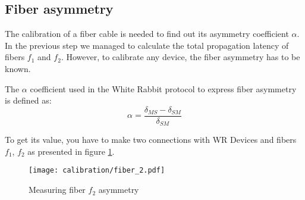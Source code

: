 \subsection{Fiber asymmetry}
\label{subsec:fiasym}

The calibration of a fiber cable is needed to find out its asymmetry coefficient
$\alpha$. In the previous step we managed to calculate the total propagation
latency of fibers $f_1$ and $f_2$. However, to calibrate any device, the fiber
asymmetry has to be known.

The $\alpha$ coefficient used in the White Rabbit protocol to express fiber 
asymmetry is defined as:
\begin{equation}
	\alpha = \frac{\delta_{MS} - \delta_{SM}}{\delta_{SM}}
\end{equation}

To get its value, you have to make two connections with WR Devices and fibers
$f_1$, $f_2$ as presented in figure \ref{fig:fiasym}.

\begin{figure}[ht]
	\begin{center}
		\texttt{[image: calibration/fiber\_2.pdf]}
		\caption{Measuring fiber $f_2$ asymmetry}
		\label{fig:fiasym}
	\end{center}
\end{figure}

